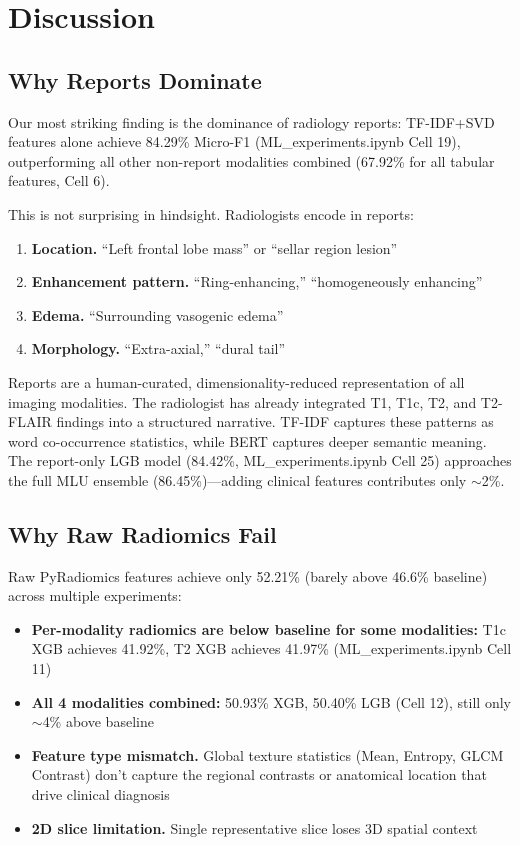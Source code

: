 \section{Discussion}
\label{sec:discussion}

\subsection{Why Reports Dominate}

Our most striking finding is the dominance of radiology reports: TF-IDF+SVD features alone achieve 84.29\% Micro-F1 (ML\_experiments.ipynb Cell 19), outperforming all other non-report modalities combined (67.92\% for all tabular features, Cell 6).

This is not surprising in hindsight. Radiologists encode in reports:
\begin{enumerate}
  \item \textbf{Location.} ``Left frontal lobe mass'' or ``sellar region lesion''
  \item \textbf{Enhancement pattern.} ``Ring-enhancing,'' ``homogeneously enhancing''
  \item \textbf{Edema.} ``Surrounding vasogenic edema''
  \item \textbf{Morphology.} ``Extra-axial,'' ``dural tail''
\end{enumerate}

Reports are a human-curated, dimensionality-reduced representation of all imaging modalities. The radiologist has already integrated T1, T1c, T2, and T2-FLAIR findings into a structured narrative. TF-IDF captures these patterns as word co-occurrence statistics, while BERT captures deeper semantic meaning. The report-only LGB model (84.42\%, ML\_experiments.ipynb Cell 25) approaches the full MLU ensemble (86.45\%)---adding clinical features contributes only $\sim$2\%.

\subsection{Why Raw Radiomics Fail}

Raw PyRadiomics features achieve only 52.21\% (barely above 46.6\% baseline) across multiple experiments:

\begin{itemize}
  \item \textbf{Per-modality radiomics are below baseline for some modalities:} T1c XGB achieves 41.92\%, T2 XGB achieves 41.97\% (ML\_experiments.ipynb Cell 11)
  \item \textbf{All 4 modalities combined:} 50.93\% XGB, 50.40\% LGB (Cell 12), still only $\sim$4\% above baseline
  \item \textbf{Feature type mismatch.} Global texture statistics (Mean, Entropy, GLCM Contrast) don't capture the regional contrasts or anatomical location that drive clinical diagnosis
  \item \textbf{2D slice limitation.} Single representative slice loses 3D spatial context
\end{itemize}

